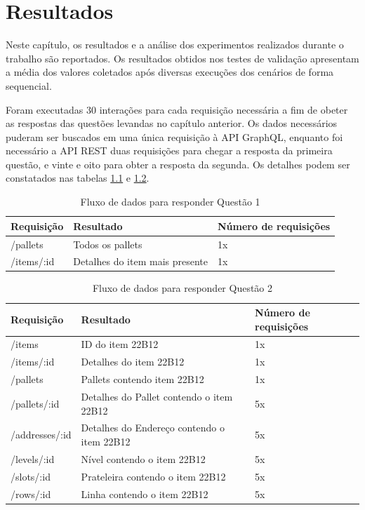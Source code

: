 \chapter{Resultados}

Neste capítulo, os resultados e a análise dos experimentos realizados durante o trabalho são reportados. Os resultados obtidos nos testes de validação apresentam a média dos valores coletados após diversas execuções dos cenários de forma sequencial.

Foram executadas 30 interações para cada requisição necessária a fim de obeter as respostas das questões levandas no capítulo anterior. Os dados necessários puderam ser buscados em uma única requisição à API GraphQL, enquanto foi necessário a API REST duas requisições para chegar a resposta da primeira questão, e vinte e oito para obter a resposta da segunda. Os detalhes podem ser constatados nas tabelas \ref{tab:request-table1} e \ref{tab:request-table2}.

\begin{table}[htbp]
    \centering
    \begin{tabular}{| l | l | l |}
        \hline
        \textbf{Requisição} & \textbf{Resultado} & \textbf{Número de requisições} \\ \hline
        /pallets & Todos os pallets & 1x \\ \hline
        /items/:id & Detalhes do item mais presente & 1x \\ \hline
    \end{tabular}
    \caption{Fluxo de dados para responder Questão 1} 
    \label{tab:request-table1}
\end{table}

\begin{table}[htbp]
    \centering
    \begin{tabular}{| l | l | l |}
        \hline
        \textbf{Requisição} & \textbf{Resultado} & \textbf{Número de requisições} \\ \hline
        /items & ID do item 22B12 & 1x \\ \hline
        /items/:id & Detalhes do item 22B12 & 1x \\ \hline
        /pallets & Pallets contendo item 22B12 & 1x \\ \hline
        /pallets/:id & Detalhes do Pallet contendo o item 22B12 & 5x \\ \hline
        /addresses/:id & Detalhes do Endereço contendo o item 22B12 & 5x \\ \hline
        /levels/:id & Nível contendo o item 22B12 & 5x \\ \hline
        /slots/:id & Prateleira contendo o item 22B12 & 5x  \\ \hline
        /rows/:id & Linha contendo o item 22B12 & 5x \\ \hline
    \end{tabular}
    \caption{Fluxo de dados para responder Questão 2} 
    \label{tab:request-table2}
\end{table}

